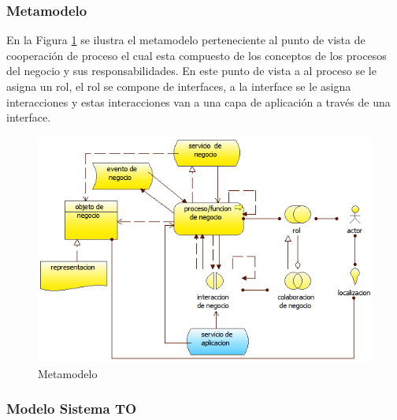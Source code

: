     \subsubsection{Metamodelo}
    En la Figura \ref{metamodelo5} se ilustra el metamodelo perteneciente al punto de vista de cooperación de proceso el cual esta compuesto de los conceptos de los procesos del   negocio y sus responsabilidades. En este punto de vista a al proceso se le asigna un rol, el rol se compone de interfaces, a la interface se le asigna interacciones y estas  interacciones van a una capa de aplicación a través de una interface. \cite{ref9}
    \begin{figure}[h]
      \centering
      \includegraphics{Imagenes/Metamodelos/05}
      \caption{Metamodelo}
      \label{metamodelo5}
    \end{figure}
\subsubsection{Modelo Sistema TO}
